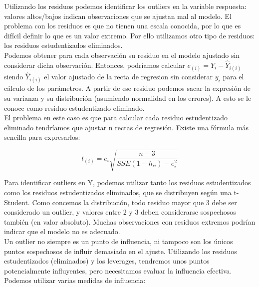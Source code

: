 Utilizando los residuos podemos identificar los outliers en la variable respuesta: valores altos/bajos indican observaciones que se ajustan mal al modelo.
El problema con los residuos es que no tienen una escala conocida, por lo que es difícil definir lo que es un valor extremo. Por ello utilizamos otro tipo de residuos: los residuos estudentizados eliminados.\\

Podemos obtener para cada observación su residuo en el modelo ajustado sin considerar dicha observación. Entonces, podríamos calcular $e_{(i)}=Y_i-\hat Y_{i(i)}$ siendo $\hat Y_{i(i)}$ el valor ajustado de la recta de regresion sin considerar $y_i$ para el cálculo de los parámetros.
A partir de ese residuo podemos sacar la expresión de su varianza y su distribución (asumiendo normalidad en los errores). A esto se le conoce como residuo estudentizado eliminado.\\

El problema en este caso es que para calcular cada residuo estudentizado eliminado tendríamos que ajustar n rectas de regresión. Existe una fórmula más sencilla para expresarlos:

$$
t_{(i)}=e_i\sqrt{\frac{n-3}{SSE(1-h_{ii})-e_i^2}}
$$

Para identificar outliers en Y, podemos utilizar tanto los residuos estudentizados como los residuos estudentizados eliminados, que se distribuyen según una t-Student. Como concemos la distribución, todo residuo mayor que 3 debe ser considerado un outlier, y valores entre 2 y 3 deben considerarse sospechosos también (en valor absoluto). 
Muchas observaciones con residuos extremos podrían indicar que el modelo no es adecuado.\\

Un outlier no siempre es un punto de influencia, ni tampoco son los únicos puntos sospechosos de influir demasiado en el ajuste. Utilizando los residuos estudentizados (eliminados) y los leverages, tendremos unos puntos potencialmente influyentes, pero necesitamos evaluar la influencia efectiva.
Podemos utilizar varias medidas de influencia:

